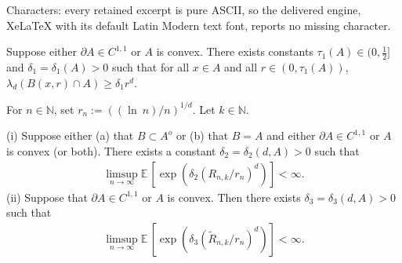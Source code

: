 \documentclass[10pt,a4paper]{amsart}
\newcommand{\E}{\mathbb E \,}
\newcommand{\N}{\mathbb{N}}
\newcommand{\tR}{{\tilde{R}}}
\renewcommand{\log}{{\ln \:}}
\begin{document}
Characters: every retained excerpt is pure ASCII, so the delivered engine, XeLaTeX with its default Latin Modern text font, reports no missing character.
\begin{lemm}
	\label{l:conecond}
	Suppose either $\partial A \in C^{1,1}$ or $A$ is convex.
	There exists  constants $\tau_1(A) \in (0,\frac12]$
	and $\delta_1 = \delta_1(A) >0$
	such that for all $x \in A$ and all $r \in (0,\tau_1(A))$,
	$\lambda_d(B(x,r) \cap A) \geq \delta_1 r^d$.
\end{lemm}

\begin{lemm}
\label{meanlem}
	For $n \in \N$, set $r_n:= ((\log n)/ n )^{1/d}   $.
	Let $k \in \mathbb N$. 

	(i) Suppose  either (a) that
	$B \subset A^o$  or (b) that 
	$B=A$ and either $\partial A \in C^{1,1}$ or $A$ is convex (or both). 
	There exists a constant $\delta_2 = \delta_2(d,A) >0$ such that
	\begin{align}
	\limsup_{n \to \infty} \E[ \exp(\delta_2  (R_{n,k}/r_n)^d)] < \infty.
\label{eqmeanlem}
	\end{align}
	(ii) Suppose that  $\partial A \in C^{1,1}$ or $A$ is convex.
	Then there exists $\delta_3 = \delta_3(d,A) > 0$ such that 
	\begin{align}
	\limsup_{n \to \infty} \E[ \exp(\delta_3  (\tR_{n,k}/r_n)^d)] < \infty.
\label{eqmeanlem2}
	\end{align}
\end{lemm}
\end{document}
